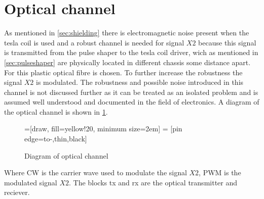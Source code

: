 \section{Optical channel}
\label{sec:optical}

As mentioned in \cref{sec:shielding} there is electromagnetic noise present when the tesla coil is used and a robust channel is needed for signal $X2$ because this signal is transmitted from the pulse shaper to the tesla coil driver, wich as mentioned in \cref{sec:pulseshaper} are physically located in different chassis some distance apart. For this plastic optical fibre is chosen. To further increase the robustness the signal $X2$ is modulated. The robustness and possible noise introduced in this channel is not discussed further as it can be treated as an isolated problem and is assumed well understood and documented in the field of electronics. A diagram of the optical channel is shown in \cref{fig:opticalchannel}.

\begin{figure}[H]
    \centering
    =[draw, fill=yellow!20, minimum size=2em]
     = [pin edge={to-,thin,black}]
    \caption{Diagram of optical channel}
    \label{fig:opticalchannel}
\end{figure}

Where CW is the carrier wave used to modulate the signal $X2$, PWM is the modulated signal $X2$. The blocks tx and rx are the optical transmitter and reciever.